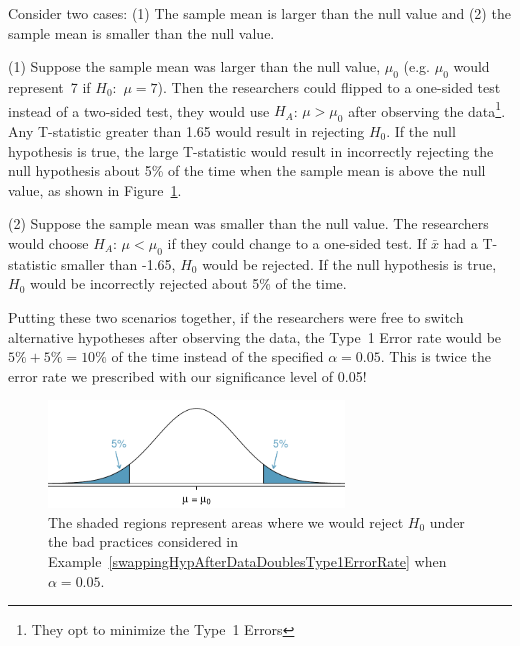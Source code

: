 \begin{example}{Consider two cases: (1) The sample mean is larger than the null value and (2) the sample mean is smaller than the null value. 

(1) Suppose the sample mean was larger than the null value, $\mu_0$ (e.g. $\mu_0$ would represent~7 if $H_0$:~$\mu = 7$). Then the researchers could flipped to a one-sided test instead of a two-sided test, they would use $H_A$: $\mu > \mu_0$ after observing the data\footnote{They opt to minimize the Type~1 Errors}. Any T-statistic greater than 1.65 would result in rejecting $H_0$. If the null hypothesis is true, the large T-statistic would result in incorrectly rejecting the null hypothesis about 5\% of the time when the sample mean is above the null value, as shown in Figure~\ref{type1ErrorDoublingExampleFigure}.

(2) Suppose the sample mean was smaller than the null value. The researchers would choose $H_A$: $\mu < \mu_0$ if they could change to a one-sided test. If $\bar{x}$ had a T-statistic smaller than -1.65, $H_0$ would be rejected. If the null hypothesis is true, $H_0$ would be incorrectly rejected about 5\% of the time.}

Putting these two scenarios together, if the researchers were free to switch alternative hypotheses after observing the data, the Type~1 Error rate would be $5\%+5\%=10\%$ of the time instead of the specified $\alpha = 0.05$. This is twice the error rate we prescribed with our significance level of 0.05! 

\begin{figure}
   \centering
   \includegraphics[width=0.7\textwidth]{ch_inference_foundations_oi_biostat/figures/type1ErrorDoublingExampleFigure/type1ErrorDoublingExampleFigure}
   \caption{The shaded regions represent areas where we would reject $H_0$ under the bad practices considered in Example~\ref{swappingHypAfterDataDoublesType1ErrorRate} when $\alpha = 0.05$.}
   \label{type1ErrorDoublingExampleFigure}
\end{figure}

\end{example}

